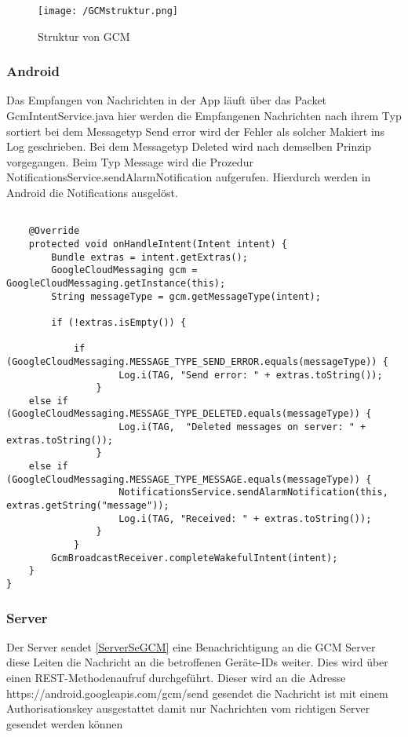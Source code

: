 \begin{figure}[H]
\centering
\texttt{[image: /GCMstruktur.png]}
\caption{Struktur von GCM}
\label{fig:GCMstrukutr}
\end{figure}

\subsubsection*{Android}
Das Empfangen von Nachrichten in der App läuft über das Packet GcmIntentService.java hier werden die Empfangenen Nachrichten nach ihrem Typ sortiert bei dem Messagetyp Send error wird der Fehler als solcher Makiert ins Log geschrieben. Bei dem Messagetyp Deleted wird nach demselben Prinzip vorgegangen. Beim Typ Message wird die Prozedur NotificationsService.sendAlarmNotification aufgerufen. Hierdurch werden in Android die Notifications ausgelöst.\\

\begin{lstlisting}[caption={Empfangen von GCM Nachrichten unter Android},label=lst:GCMget]

    @Override
    protected void onHandleIntent(Intent intent) {
        Bundle extras = intent.getExtras();
        GoogleCloudMessaging gcm = GoogleCloudMessaging.getInstance(this);
        String messageType = gcm.getMessageType(intent);

        if (!extras.isEmpty()) {

            if (GoogleCloudMessaging.MESSAGE_TYPE_SEND_ERROR.equals(messageType)) {
            		Log.i(TAG, "Send error: " + extras.toString());
	            }
 	else if (GoogleCloudMessaging.MESSAGE_TYPE_DELETED.equals(messageType)) {
            		Log.i(TAG,  "Deleted messages on server: " + extras.toString());
            	}
	else if (GoogleCloudMessaging.MESSAGE_TYPE_MESSAGE.equals(messageType)) {
            		NotificationsService.sendAlarmNotification(this, extras.getString("message"));
                	Log.i(TAG, "Received: " + extras.toString());
            	}
        	}
        GcmBroadcastReceiver.completeWakefulIntent(intent);
	} 
}

\end{lstlisting}

\subsubsection*{Server}
Der Server sendet \ref{ServerSeGCM} eine Benachrichtigung an die GCM Server diese Leiten die Nachricht an die betroffenen Geräte-IDs weiter. Dies wird über einen REST-Methodenaufruf durchgeführt. Dieser wird an die Adresse https://android.googleapis.com/gcm/send gesendet die Nachricht ist mit einem Authorisationskey ausgestattet damit nur Nachrichten vom richtigen Server gesendet werden können 

